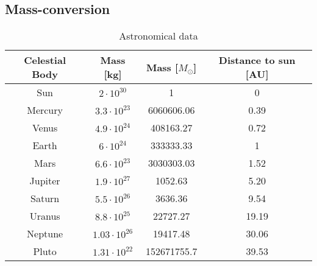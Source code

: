 \documentclass{article}
\begin{document}
\subsection{Mass-conversion} \label{app:mass}


\begin{table}[H]
  \centering
  \caption{Astronomical data}
  \vspace{2mm}
  \label{tab:mass}
  \begin{tabular}{|c|c|c|c|}
      \hline
       Celestial Body & Mass [kg] & Mass [$M_{\odot}$] & Distance to sun [AU]\\
      \hline \hline
      Sun     & $ 2    \cdot10^{30} $ & 1           & 0 \\
      Mercury & $ 3.3  \cdot10^{23} $ & 6060606.06  & 0.39 \\
      Venus   & $ 4.9  \cdot10^{24} $ & 408163.27   & 0.72 \\
      Earth   & $ 6    \cdot10^{24} $ & 333333.33   & 1 \\
      Mars    & $ 6.6  \cdot10^{23} $ & 3030303.03  & 1.52 \\
      Jupiter & $ 1.9  \cdot10^{27} $ & 1052.63     & 5.20 \\
      Saturn  & $ 5.5  \cdot10^{26} $ & 3636.36     & 9.54 \\
      Uranus  & $ 8.8  \cdot10^{25} $ & 22727.27    & 19.19 \\
      Neptune & $ 1.03 \cdot10^{26} $ & 19417.48    & 30.06 \\
      Pluto   & $ 1.31 \cdot10^{22} $ & 152671755.7 & 39.53 \\
      \hline
  \end{tabular} \\
  \hspace{0pt}\\
\end{table}


\iffalse
\begin{align*}
    2 \cosh (x) &= e^x + e^{-x} \\
    2 \sinh (x) &= e^x - e^{-x}
\end{align*} \\
\fi





\end{document}
